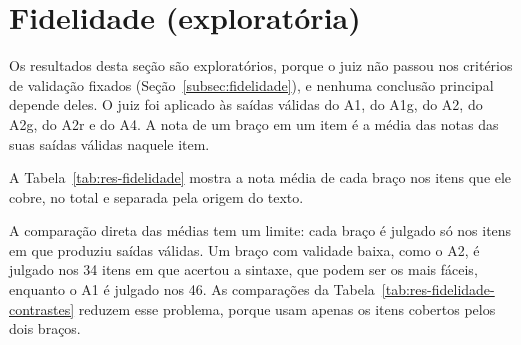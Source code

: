 \section{Fidelidade (exploratória)}\label{sec:res-fidelidade}

Os resultados desta seção são exploratórios, porque o juiz não passou nos critérios de validação fixados (Seção~\ref{subsec:fidelidade}), e nenhuma conclusão principal depende deles. O juiz foi aplicado às saídas válidas do A1, do A1g, do A2, do A2g, do A2r e do A4. A nota de um braço em um item é a média das notas das suas saídas válidas naquele item.

A Tabela~\ref{tab:res-fidelidade} mostra a nota média de cada braço nos itens que ele cobre, no total e separada pela origem do texto.

\begin{table}[htb]
\end{table}

A comparação direta das médias tem um limite: cada braço é julgado só nos itens em que produziu saídas válidas. Um braço com validade baixa, como o A2, é julgado nos 34 itens em que acertou a sintaxe, que podem ser os mais fáceis, enquanto o A1 é julgado nos 46. As comparações da Tabela~\ref{tab:res-fidelidade-contrastes} reduzem esse problema, porque usam apenas os itens cobertos pelos dois braços.

